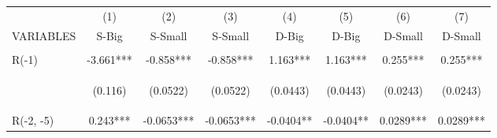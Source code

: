 \documentclass[]{article}
\begin{document}
\begin{center}
\begin{tabular}{lccccccc} \hline
 & (1) & (2) & (3) & (4) & (5) & (6) & (7) \\
VARIABLES & S-Big & S-Small & S-Small & D-Big & D-Big & D-Small & D-Small \\ \hline
\vspace{4pt} & \begin{footnotesize}\end{footnotesize} & \begin{footnotesize}\end{footnotesize} & \begin{footnotesize}\end{footnotesize} & \begin{footnotesize}\end{footnotesize} & \begin{footnotesize}\end{footnotesize} & \begin{footnotesize}\end{footnotesize} & \begin{footnotesize}\end{footnotesize} \\
R(-1) & -3.661*** & -0.858*** & -0.858*** & 1.163*** & 1.163*** & 0.255*** & 0.255*** \\
\vspace{4pt} & \begin{footnotesize}(0.116)\end{footnotesize} & \begin{footnotesize}(0.0522)\end{footnotesize} & \begin{footnotesize}(0.0522)\end{footnotesize} & \begin{footnotesize}(0.0443)\end{footnotesize} & \begin{footnotesize}(0.0443)\end{footnotesize} & \begin{footnotesize}(0.0243)\end{footnotesize} & \begin{footnotesize}(0.0243)\end{footnotesize} \\
R(-2, -5) & 0.243*** & -0.0653*** & -0.0653*** & -0.0404** & -0.0404** & 0.0289*** & 0.0289*** \\

\end{tabular}
\end{center}
\end{document}
